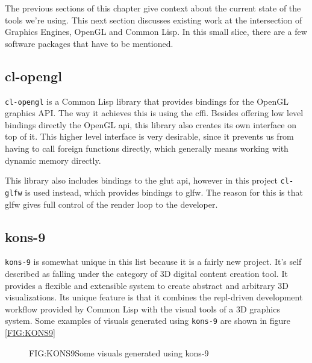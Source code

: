 
\label{SEC:SOTA}

The previous sections of this chapter give context about the current state of the tools we're using.
This next section discusses existing work at the intersection of Graphics Engines, OpenGL and Common Lisp.
In this small slice,
there are a few software packages that have to be mentioned.

\subsection{cl-opengl}


\texttt{cl-opengl}\cite{clopengl} is a Common Lisp library that provides bindings for the OpenGL graphics API.
The way it achieves this is using the \ac{cffi}.
Besides offering low level bindings directly the OpenGL \ac{api},
this library also creates its own interface on top of it.
This higher level interface is very desirable,
since it prevents us from having to call foreign functions directly,
which generally means working with dynamic memory directly\cite{cffi}.

This library also includes bindings to the \ac{glut} \ac{api},
however in this project \texttt{cl-glfw} is used instead,
which provides bindings to \ac{glfw}.
The reason for this is that \ac{glfw} gives full control of the render loop to the developer.

\subsection{kons-9}

\texttt{kons-9}\cite{kons9} is somewhat unique in this list because it is a fairly new project.
It's self described as falling under the category of 3D digital content creation tool.
It provides a flexible and extensible system to create abstract and arbitrary 3D visualizations.
Its unique feature is that it combines the \ac{repl}-driven development workflow provided by Common Lisp with the visual tools of a 3D graphics system.
Some examples of visuals generated using \texttt{kons-9} are shown in figure \ref{FIG:KONS9}

\begin{figure}[Kons-9 example]{FIG:KONS9}{Some visuals generated using kons-9}
\end{figure}

